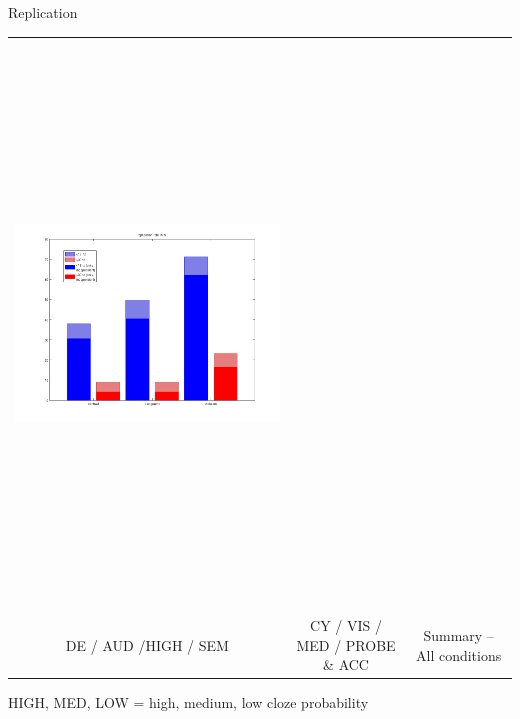 \documentclass[final]{beamer}
\begin{document}
\begin{frame}{}
\begin{textblock}{67}
\begin{block}{Replication}
\begin{tabular}{c c c}
 \includegraphics[height=15cm]{reprate} \\
DE / AUD /HIGH / SEM & CY / VIS / MED / PROBE \& ACC &  Summary -- All conditions \\
\end{tabular}
\end{block}
\small
HIGH, MED, LOW = high, medium, low cloze probability 


\end{textblock}
\end{frame}
\end{document}
